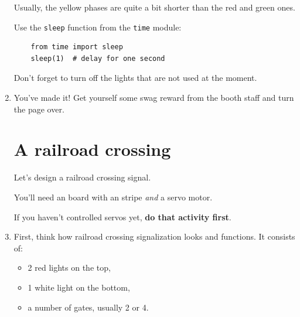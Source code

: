 \documentclass{../tutorial}
\begin{document}
\begin{enumerate}
    Usually, the yellow phases are quite a bit shorter than
    the red and green ones.

    Use the \lstinline|sleep| function from the \lstinline|time| module:

    \begin{lstlisting}
    from time import sleep
    sleep(1)  # delay for one second
    \end{lstlisting}

    Don't forget to turn off the lights that are not used at the moment.

\item
    You've made it!
    Get yourself some swag reward from the booth staff and turn the page over.

\clearpage

\section{A railroad crossing}

    Let's design a railroad crossing signal.

    You'll need an  board with an   stripe
    \emph{and} a servo motor.

    If you haven't controlled servos yet, \textbf{do that activity first}.

\item
    First, think how railroad crossing signalization looks and functions.
    It consists of:

    \begin{itemize}
    \item 2 red lights on the top,
    \item 1 white light on the bottom,
    \item a number of gates, usually 2 or 4.
    \end{itemize}


\end{enumerate}
\end{document}
